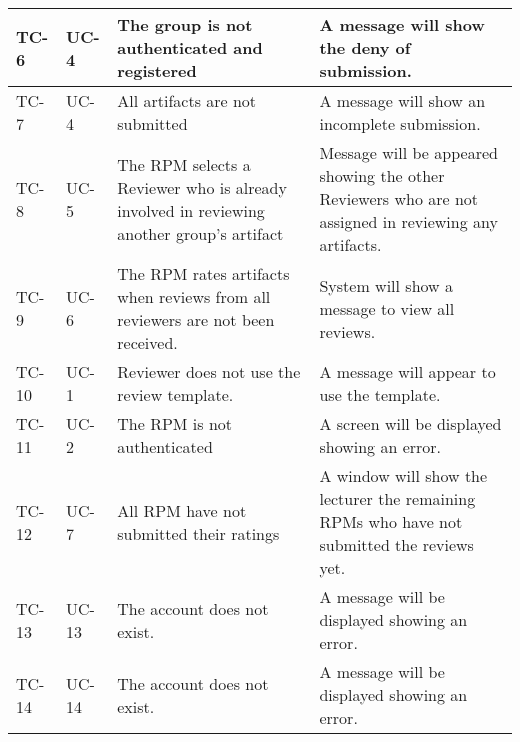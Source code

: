 \begin{center}
\begin{table}[]
\begin{tabular}{ | l | l | p{5cm} | p{5cm} |}
TC-6                                     & UC-4                                      & The group is not authenticated and registered                                                                & A message will show the deny of submission.                                                           \\ \hline
TC-7                                     & UC-4                                      & All artifacts are not submitted                                                                              & A message will show an incomplete submission.                                                         \\ \hline
TC-8                                     & UC-5                                      & The RPM selects a Reviewer who is already involved in reviewing another group’s artifact                     & Message will be appeared showing the other Reviewers who are not assigned in reviewing any artifacts. \\ \hline
TC-9                                     & UC-6                                      & The RPM rates artifacts when reviews from all reviewers are not been received.                               & System will show a message to view all reviews.                                                       \\ \hline
TC-10                                    & UC-1                                      & Reviewer does not use the review template.                                                                   & A message will appear to use the template.                                                            \\ \hline
TC-11                                    & UC-2                                      & The RPM is not authenticated                                                                                 & A screen will be displayed showing an error.                                                          \\ \hline
TC-12                                    & UC-7                                      & All RPM have not submitted their ratings                                                                     & A window will show the lecturer the remaining RPMs who have not submitted the reviews yet.            \\ \hline
TC-13                                    & UC-13                                     & The account does not exist.                                                                                  & A message will be displayed showing an error.                                                         \\ \hline
TC-14                                    & UC-14                                     & The account does not exist.                                                                                  & A message will be displayed showing an error.                                                         \\ \hline
\end{tabular}%


\end{table}
\end{center}
